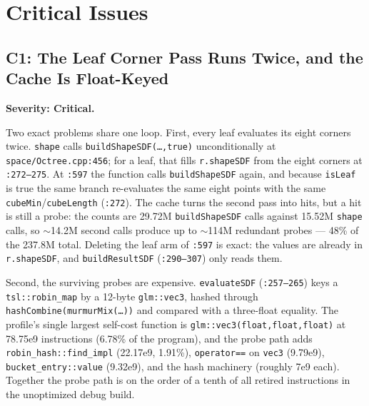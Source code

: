 \documentclass[11pt,a4paper]{article}
\begin{document}
\section{Critical Issues}

\subsection{C1: The Leaf Corner Pass Runs Twice, and the Cache Is Float-Keyed}
\label{sec:c1}

\textbf{Severity: Critical.}

Two exact problems share one loop. First, every leaf evaluates its eight
corners twice. \texttt{shape} calls
\texttt{buildShapeSDF(\ldots,true)} unconditionally at
\texttt{space/Octree.cpp:456}; for a leaf, that fills \texttt{r.shapeSDF}
from the eight corners at \texttt{:272--275}. At \texttt{:597} the function
calls \texttt{buildShapeSDF} again, and because \texttt{isLeaf} is true the
same branch re-evaluates the same eight points with the same
\texttt{cubeMin}/\texttt{cubeLength} (\texttt{:272}). The cache turns the
second pass into hits, but a hit is still a probe: the counts are 29.72M
\texttt{buildShapeSDF} calls against 15.52M \texttt{shape} calls, so
$\sim$14.2M second calls produce up to $\sim$114M redundant probes --- 48\%
of the 237.8M total. Deleting the leaf arm of \texttt{:597} is exact: the
values are already in \texttt{r.shapeSDF}, and \texttt{buildResultSDF}
(\texttt{:290--307}) only reads them.

Second, the surviving probes are expensive. \texttt{evaluateSDF}
(\texttt{:257--265}) keys a \texttt{tsl::robin\_map} by a 12-byte
\texttt{glm::vec3}, hashed through \texttt{hashCombine(murmurMix(\ldots))}
and compared with a three-float equality. The profile's single largest
self-cost function is \texttt{glm::vec3(float,float,float)} at 78.75e9
instructions (6.78\% of the program), and the probe path adds
\texttt{robin\_hash::find\_impl} (22.17e9, 1.91\%), \texttt{operator==} on
\texttt{vec3} (9.79e9), \texttt{bucket\_entry::value} (9.32e9), and the hash
machinery (roughly 7e9 each). Together the probe path is on the order of a
tenth of all retired instructions in the unoptimized debug build.
\end{document}
